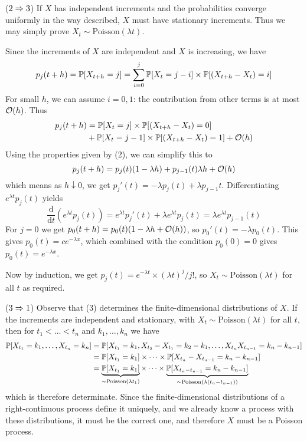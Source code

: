 \documentclass{article}
\begin{document}
\begin{prf}
    ($2 \Ra 3$) If $X$ has independent increments and the probabilities converge uniformly in the way described, $X$ must have stationary increments. Thus we may simply prove $X_t \sim \mathrm{Poisson}(\lambda t)$.
    
    Since the increments of $X$ are independent and $X$ is increasing, we have
    \[
	p_j(t + h) = \P[X_{t+h} = j] = \sum_{i=0}^j \P[X_t = j-i] \times \P[(X_{t+h} - X_t) = i]
	\]
	For small $h$, we can assume $i = 0, 1$: the contribution from other terms is at most $\calO(h)$. Thus
	\begin{align*}
    	p_j(t + h) &= \P[X_t = j] \times \P[(X_{t+h} - X_t) = 0] \\
    	&+ \P[X_t = j-1] \times \P[(X_{t+h} - X_t) = 1]  + \calO(h)
	\end{align*}
	Using the properties given by (2), we can simplify this to
	\[
	p_j(t+h) = p_j(t) (1-\lambda h) + p_{j-1}(t) \lambda h + \calO(h)
	\]
	which means as $h \downarrow 0$, we get $p_j'(t) = -\lambda p_j(t) + \lambda p_{j -1} t$. Differentiating $e^{\lambda t} p_j(t)$ yields
	\[
	\frac{\mathrm d}{\mathrm dt} \left( e^{\lambda t} p_j(t) \right) = e^{\lambda t} p_j'(t) + \lambda e^{\lambda t} p_j(t) = \lambda e^{\lambda t} p_{j-1}(t)
	\]
	For $j = 0$ we get $p_0 (t+h) = p_0 (t)(1-\lambda h + \calO(h))$, so $p_0'(t) = -\lambda p_0(t)$. This gives $p_0(t) = ce^{-\lambda x}$, which combined with the condition $p_0(0) = 0$ gives $p_0(t) = e^{-\lambda x}$.
	
	Now by induction, we get $p_j(t) = e^{-\lambda t} \times (\lambda t)^j / j!$, so $X_t \sim \mathrm{Poisson}(\lambda t)$ for all $t$ as required.
\end{prf}

\begin{prf}
	($3 \Ra 1$) Observe that (3) determines the finite-dimensional distributions of $X$. If the increments are independent and stationary, with $X_t \sim \mathrm{Poisson}(\lambda t)$ for all $t$, then for $t_1 < \dots < t_n$ and $k_1, \dots, k_n$ we have
	\begin{align*}
    	\P[X_{t_1} = k_1, \dots, X_{t_n} = k_n] &= \P[X_{t_1} = k_1, X_{t_2}-X_{t_1} = k_2-k_1, \dots, X_{t_n}X_{t_{n-1}} = k_n- k_{n-1}] \\
    	&= \P[X_{t_1} = k_1] \times \dots \times \P[X_{t_n}-X_{t_{n-1}} = k_n- k_{n-1}] \\
    	&= \underbrace{\P[X_{t_1} = k_1]}_{\sim \mathrm{Poisson}(\lambda t_1)} \times \dots \times \underbrace{\P[X_{t_n-t_{n-1}} = k_n- k_{n-1}]}_{\sim \mathrm{Poisson}(\lambda (t_n - t_{n-1}))}
	\end{align*}
	which is therefore determinate. Since the finite-dimensional distributions of a right-continuous process define it uniquely, and we already know a process with these distributions, it must be the correct one, and therefore $X$ must be a Poisson process.
\end{prf}
\end{document}
